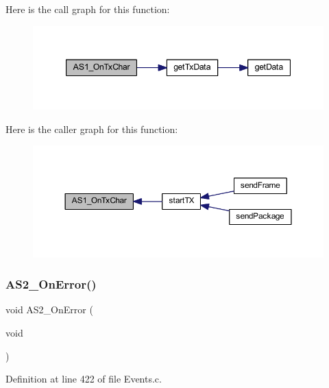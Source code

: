 Here is the call graph for this function\+:
\nopagebreak
\begin{figure}[H]
\begin{center}
\leavevmode
\includegraphics[width=347pt]{group___events__module_gad4ca2c06cb7fdb57a52811247371565c_cgraph}
\end{center}
\end{figure}
Here is the caller graph for this function\+:
\nopagebreak
\begin{figure}[H]
\begin{center}
\leavevmode
\includegraphics[width=350pt]{group___events__module_gad4ca2c06cb7fdb57a52811247371565c_icgraph}
\end{center}
\end{figure}
\mbox{\label{group___events__module_ga0137853d241c656b6bf6653ebfc64cac}} 
\subsubsection{\texorpdfstring{A\+S2\+\_\+\+On\+Error()}{AS2\_OnError()}}
{\footnotesize\ttfamily void A\+S2\+\_\+\+On\+Error (\begin{DoxyParamCaption}\item[{void}]{ }\end{DoxyParamCaption})}



Definition at line 422 of file Events.\+c.

